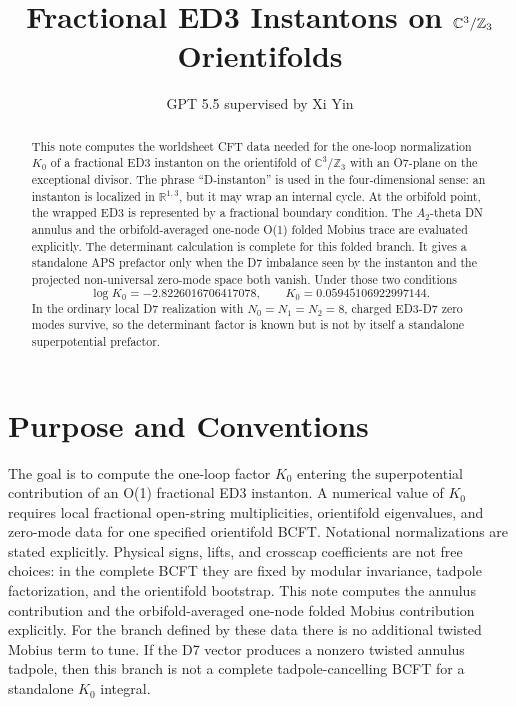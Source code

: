 \documentclass[11pt]{article}
\title{Fractional ED3 Instantons on \texorpdfstring{$\C^3/\Z_3$}{C3/Z3} Orientifolds}
\author{GPT 5.5 supervised by Xi Yin}
\date{}
\newcommand{\C}{\mathbb{C}}
\newcommand{\R}{\mathbb{R}}
\newcommand{\Z}{\mathbb{Z}}
\begin{document}
\maketitle

\begin{abstract}
This note computes the worldsheet CFT data needed for the one-loop normalization \(K_0\) of a
fractional ED3 instanton on the orientifold of \(\C^3/\Z_3\) with an O7-plane on the exceptional
divisor. The phrase ``D-instanton'' is used in the four-dimensional sense: an instanton is
localized in \(\R^{1,3}\), but it may wrap an internal cycle. At the orbifold point, the wrapped
ED3 is represented by a fractional boundary condition. The \(A_2\)-theta DN annulus and the
orbifold-averaged one-node O(1) folded Mobius trace are evaluated explicitly. The determinant
calculation is complete for this folded branch. It gives a standalone APS prefactor only when
the D7 imbalance seen by the instanton and the projected non-universal zero-mode space both
vanish. Under those two conditions
\[
  \log K_0=-2.8226016706417078,
  \qquad
  K_0=0.05945106922997144 .
\]
In the ordinary local D7 realization with \(N_0=N_1=N_2=8\), charged ED3-D7 zero modes survive,
so the determinant factor is known but is not by itself a standalone superpotential prefactor.
\end{abstract}

\tableofcontents

\section{Purpose and Conventions}

The goal is to compute the one-loop factor \(K_0\) entering the superpotential contribution of an
O(1) fractional ED3 instanton. A numerical value of $K_0$ requires local fractional
open-string multiplicities, orientifold eigenvalues, and zero-mode data for one specified
orientifold BCFT. Notational normalizations are stated explicitly. Physical signs, lifts, and
crosscap coefficients are not free choices: in the complete BCFT they are fixed by modular
invariance, tadpole factorization, and the orientifold bootstrap. This note computes the
annulus contribution and the orbifold-averaged one-node folded Mobius contribution explicitly.
For the branch defined by these data there is no additional twisted Mobius term to tune. If the
D7 vector produces a nonzero twisted annulus tadpole, then this branch is not a complete
tadpole-cancelling BCFT for a standalone \(K_0\) integral.
\end{document}
